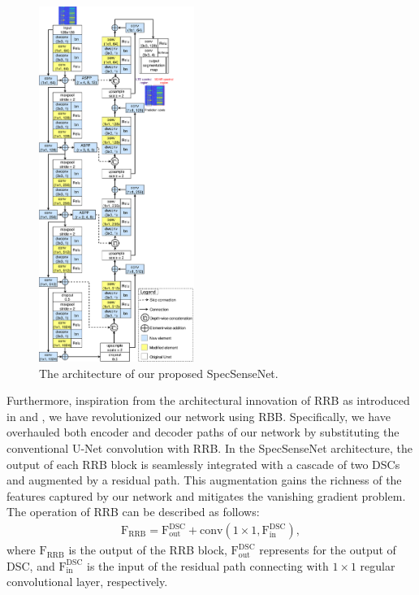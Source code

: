 \documentclass[conference]{IEEEtran} %
\begin{document}
\begin{figure}[!t]
    \centering
    \includegraphics[width=0.45\textwidth]{img/Design-SpecSenseNet.pdf}
    \caption{The architecture of our proposed SpecSenseNet.}
    \label{fig4}
\end{figure}

Furthermore, inspiration from the architectural innovation of RRB as introduced in \cite{aghalari2021brain} and \cite{he2016deep}, we have revolutionized our network using RBB. Specifically, we have overhauled both encoder and decoder paths of our network by substituting the conventional U-Net convolution with RRB. In the SpecSenseNet architecture, the output of each RRB block is seamlessly integrated with a cascade of two DSCs and augmented by a residual path. This augmentation gains the richness of the features captured by our network and mitigates the vanishing gradient problem.
The operation of RRB can be described as follows:
\begin{equation}
\begin{aligned}
    \mathrm{F_\text{RRB}} = \mathrm{F}_\text{out}^\text{DSC} + \mathrm{conv(1\times1,\mathrm{F}_\text{in}^\text{DSC})},
    \label{eq:RRB}
\end{aligned}
\end{equation}
where $\mathrm{F_\text{RRB}}$ is the output of the RRB block, $\mathrm{F}_\text{out}^\text{DSC}$ represents for the output of DSC, and $\mathrm{F}_\text{in}^\text{DSC}$ is the input of the residual path connecting with $1\times1$ regular convolutional layer, respectively.
\end{document}
